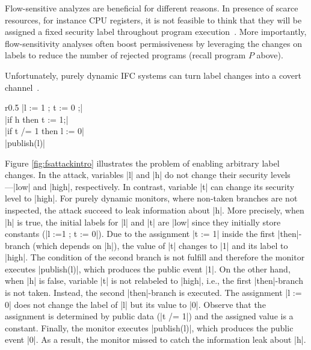 
Flow-sensitive analyzes are beneficial for different reasons. In presence of
scarce resources, for instance CPU registers, it is not feasible to think that
they will be assigned a fixed security label throughout program
execution~\citep{BonelliCM05}. More importantly, flow-sensitivity analyses often
boost permissiveness by leveraging the changes on labels to reduce the number of
rejected programs (recall program $P$ above). 


Unfortunately, purely dynamic IFC
systems can turn label changes into a covert channel~\citep{Russo:2010}. 
\begin{wrapfigure}{r}{0.5\columnwidth}
|l := 1 ; t := 0 ;| \\
|if h then t := 1;| \\
|if t /= 1 then l := 0| \\
|publish(l)| 
\caption{\small\label{fig:fsattackintro} Flow-sensitive attack}
\end{wrapfigure}
Figure \ref{fig:fsattackintro} illustrates the problem of enabling arbitrary
label changes.  In the attack, variables |l| and |h| do not change their
security levels---|low| and |high|, respectively. In contrast, variable |t| can
change its security level to |high|. For purely dynamic monitors, where
non-taken branches are not inspected, the attack succeed to leak information
about |h|. More precisely, when |h| is true, the initial labels for |l| and |t|
are |low| since they initially store constants (|l :=1 ; t := 0|).  Due to 
the assignment |t := 1| inside the
first |then|-branch (which depends on |h|), the value of |t| changes to |1| and its label to
|high|. The condition of the second branch is not fulfill and therefore 
the monitor executes |publish(l)|, which produces the public event 
|1|. On the other hand, when |h| is false, variable |t| is not relabeled to 
|high|, i.e., the first |then|-branch is not taken. Instead, the second
|then|-branch is executed. 
The assignment |l := 0| does not change the label of |l| but its value to 
 |0|. Observe that the assignment is determined by public data (|t /= 1|)
and the assigned value is a constant. Finally, the monitor executes
|publish(l)|, which produces the public event |0|. As a result, the monitor 
missed to catch the information leak about |h|.  

